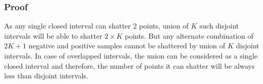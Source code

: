 \subsubsection*{Proof}
As any single closed interval can shatter 2 points, union of $K$ such disjoint intervals will be able to shatter $2\times K$ points. But any alternate combination of $2K+1$ negative and positive samples cannot be shattered by union of $K$ disjoint intervals. In case of overlapped intervals, the union can be considered as a single closed interval and therefore, the number of points it can shatter will be always less than disjoint intervals.